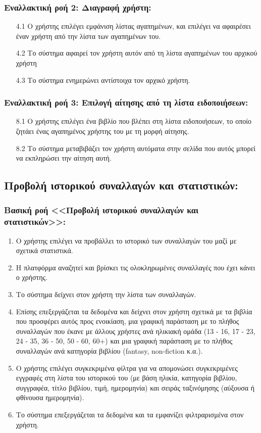 \documentclass[12pt,a4paper]{article}
\begin{document}
\subsubsection*{Εναλλακτική ροή 2: Διαγραφή χρήστη:}
\begin{enumerate}
    \item [4.1] Ο χρήστης επιλέγει εμφάνιση λίστας αγαπημένων, και επιλέγει να αφαιρέσει έναν χρήστη από την λίστα των αγαπημένων του.
    \item [4.2] Το σύστημα αφαιρεί τον χρήστη αυτόν από τη λίστα αγαπημένων του αρχικού χρήστη
    \item [4.3] Το σύστημα ενημερώνει αντίστοιχα τον αρχικό χρήστη.
\end{enumerate}

\subsubsection*{Εναλλακτική ροή 3: Επιλογή αίτησης από τη λίστα ειδοποιήσεων:}
\begin{enumerate}
    \item [8.1] Ο χρήστης επιλέγει ένα βιβλίο που βλέπει στη λίστα ειδοποιήσεων, το οποίο ζητάει ένας αγαπημένος χρήστης του με τη μορφή αίτησης.
    \item [8.2] Το σύστημα μεταβιβάζει τον χρήστη αυτόματα στην σελίδα που αυτός μπορεί να εκπληρώσει την αίτηση αυτή.
\end{enumerate}

\subsection{Προβολή ιστορικού συναλλαγών και στατιστικών:}

\subsubsection*{Βασική ροή <<Προβολή ιστορικού συναλλαγών και στατιστικών>>:}
\begin{enumerate}
    \item Ο χρήστης επιλέγει να προβάλλει το ιστορικό των συναλλαγών του μαζί με σχετικά στατιστικά.
    \item Η πλατφόρμα αναζητεί και βρίσκει τις ολοκληρωμένες συναλλαγές που έχει κάνει ο χρήστης.
    \item Το σύστημα δείχνει στον χρήστη την λίστα των συναλλαγών.
    \item Επίσης επεξεργάζεται τα δεδομένα και δείχνει στον χρήστη σχετικά με τα βιβλία που προσφέρει αυτός προς ενοικίαση, μια γραφική παράσταση με το πλήθος συναλλαγών που έκανε με άλλους χρήστες ανά ηλικιακή ομάδα (13 - 16, 17 - 23, 24 - 35, 36 - 50, 50 - 60, 60+) και μια γραφική παράσταση με το πλήθος συναλλαγών ανά κατηγορία βιβλίου (fantasy, non-fiction κ.α.).
    \item Ο χρήστης επιλέγει συγκεκριμένα φίλτρα για να απομονώσει συγκεκριμένες εγγραφές στη λίστα του ιστορικού του (με βάση ηλικία, κατηγορία βιβλίου, συγγραφέα, τίτλο βιβλίου, τιμή, ημερομηνία) και σειράς ταξινόμησης (αύξουσα ή φθίνουσα ημερομηνία).
    \item Το σύστημα επεξεργάζεται τα δεδομένα και τα εμφανίζει φιλτραρισμένα στον χρήστη.
\end{enumerate}
\end{document}
